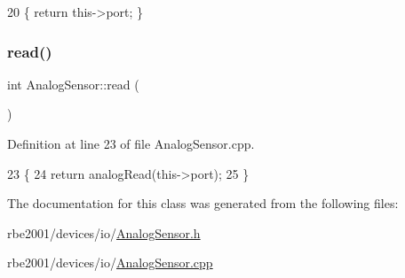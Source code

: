 \begin{DoxyCode}
20 \{ \textcolor{keywordflow}{return} this->port; \}
\end{DoxyCode}
\mbox{\label{class_analog_sensor_a4672ca490072cb436dfa37fe1e6c6a0a}} 
\subsubsection{\texorpdfstring{read()}{read()}}
{\footnotesize\ttfamily int Analog\+Sensor\+::read (\begin{DoxyParamCaption}{ }\end{DoxyParamCaption})}



Definition at line 23 of file Analog\+Sensor.\+cpp.


\begin{DoxyCode}
23                        \{
24     \textcolor{keywordflow}{return} analogRead(this->port);
25 \}
\end{DoxyCode}


The documentation for this class was generated from the following files\+:\begin{DoxyCompactItemize}
\item 
rbe2001/devices/io/\hyperlink{_analog_sensor_8h}{Analog\+Sensor.\+h}\item 
rbe2001/devices/io/\hyperlink{_analog_sensor_8cpp}{Analog\+Sensor.\+cpp}\end{DoxyCompactItemize}
